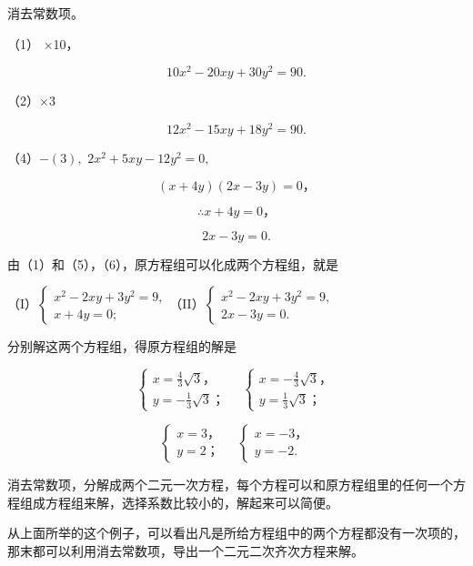  消去常数项。

（1） ×10，

\[
10 x ^ {2} - 20 x y + 30 y ^ {2} = 90. \tag{3}
\]

（2）\(\times 3\)

\[
12x^2 - 15xy + 18y^2 = 90. \tag{4}
\]

（4）\(-\left(3\right),\) \(2x^2 + 5xy - 12y^2 = 0,\)

\[
(x + 4 y) (2 x - 3 y) = 0\text{，}
\]

\[
\therefore x + 4 y = 0\text{，} \tag{5}
\]

\[
2 x - 3 y = 0. \tag{6}
\]

由（1）和（5），（6），原方程组可以化成两个方程组，就是

（I）\(\left\{ \begin{array}{l} x^{2} - 2xy + 3y^{2} = 9, \\ x + 4y = 0; \end{array} \right.\)（II）\(\left\{ \begin{array}{l} x^{2} - 2xy + 3y^{2} = 9, \\ 2x - 3y = 0. \end{array} \right.\)

分别解这两个方程组，得原方程组的解是

\[
\left\{ \begin{array}{l} x = \frac{4}{3} \sqrt {3}\text{，} \\ y = - \frac{1}{3} \sqrt {3}\text{；} \end{array} \right. \quad \left\{ \begin{array}{l} x = - \frac{4}{3} \sqrt {3}\text{，} \\ y = \frac{1}{3} \sqrt {3}\text{；} \end{array} \right.
\]

\[
\left\{ \begin{array}{l} x = 3\text{，} \\ y = 2\text{；} \end{array} \right. \quad \left\{ \begin{array}{l} x = - 3\text{，} \\ y = - 2. \end{array} \right.
\]

消去常数项，分解成两个二元一次方程，每个方程可以和原方程组里的任何一个方程组成方程组来解，选择系数比较小的，解起来可以简便。

从上面所举的这个例子，可以看出凡是所给方程组中的两个方程都没有一次项的，那末都可以利用消去常数项，导出一个二元二次齐次方程来解。

